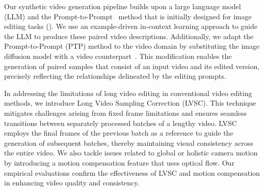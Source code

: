 Our synthetic video generation pipeline builds upon a large language model (LLM) and the Prompt-to-Prompt~\cite{prompt2prompt} method that is initially designed for image editing tasks (). We use an example-driven in-context learning approach to guide the LLM to produce these paired video descriptions. Additionally, we adapt the Prompt-to-Prompt (PTP) method to the video domain by substituting the image diffusion model with a video counterpart~\cite{ho2204video}. This modification enables the generation of paired samples that consist of an input video and its edited version, precisely reflecting the relationships delineated by the editing prompts.

In addressing the limitations of long video editing in conventional video editing methods, we introduce Long Video Sampling Correction (LVSC). This technique mitigates challenges arising from fixed frame limitations and ensures seamless transitions between separately processed batches of a lengthy video. LVSC employs the final frames of the previous batch as a reference to guide the generation of subsequent batches, thereby maintaining visual consistency across the entire video. We also tackle issues related to global or holistic camera motion by introducing a motion compensation feature that uses optical flow. Our empirical evaluations confirm the effectiveness of LVSC and motion compensation in enhancing video quality and consistency.

